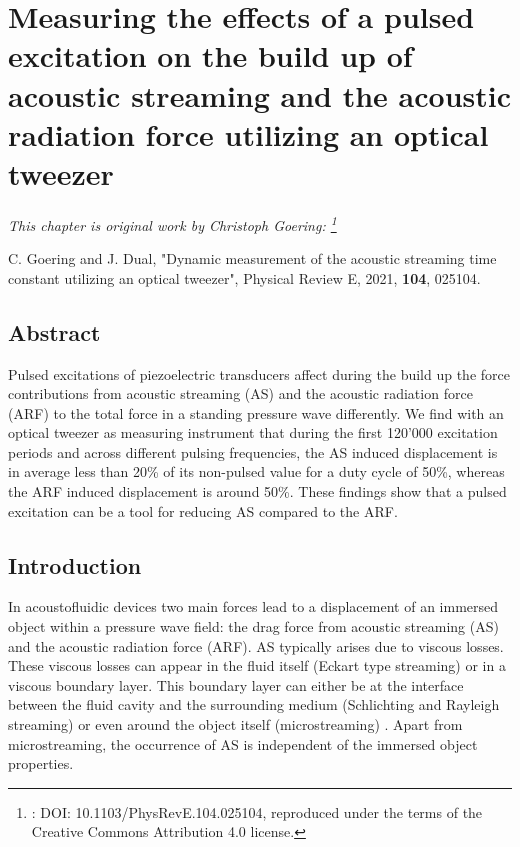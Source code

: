 \renewcommand{\relPath}{SECTION/40_Pulsing/}
 
\chapter[Pulsed Excitation Measurement]{Measuring the effects of a pulsed 
  excitation on the build up of acoustic streaming and the acoustic radiation 
  force utilizing an optical tweezer
}\label{ch:pulsing}
\textit{This chapter is original work by Christoph Goering:
\footnote{: DOI: 10.1103/PhysRevE.104.025104, reproduced under the terms of the 
Creative Commons Attribution 4.0 license.}}

\vspace{5mm} \noindent
C. Goering and J. Dual, "Dynamic measurement of the acoustic streaming time 
constant utilizing an optical tweezer", Physical Review E, 2021, \textbf{104}, 
025104.


\section{Abstract}

Pulsed excitations of piezoelectric transducers affect during the build up the 
force contributions from acoustic streaming (AS) and the acoustic radiation 
force (ARF) to the total force in a standing pressure wave differently. We find 
with an optical tweezer as measuring instrument that during the first 120'000 
excitation periods and across different pulsing frequencies, the AS induced 
displacement is in average less than 20\% of its non-pulsed value for a duty 
cycle of 50\%, whereas the ARF induced displacement is around 50\%. These 
findings show that a pulsed excitation can be a tool for reducing AS compared 
to the ARF.

\section{Introduction}

In acoustofluidic devices two main forces lead to a displacement of an immersed 
object within a pressure wave field: the drag force from acoustic streaming 
(AS) and the acoustic radiation force (ARF). AS typically arises due to viscous 
losses. These viscous losses can appear in the fluid itself (Eckart type 
streaming) \cite{Eckart1948} or in a viscous boundary layer. This boundary 
layer can either be at the interface between the fluid cavity and the 
surrounding medium (Schlichting and Rayleigh streaming) 
\cite{Nyborg1965,Schlichting1932} or even around the object itself 
(microstreaming) \cite{Baasch2019}. Apart from microstreaming, the occurrence 
of AS is independent of the immersed object properties.

